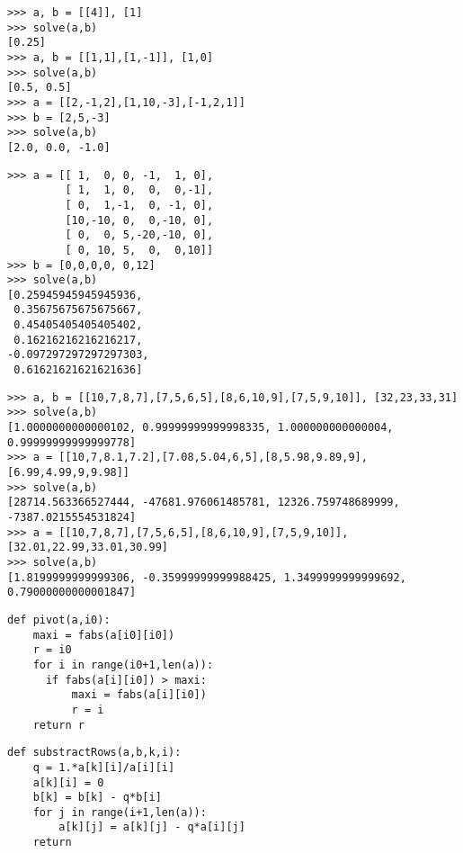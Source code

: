 \begin{description}
\begin{py}{6cm}
\begin{verbatim}
>>> a, b = [[4]], [1]
>>> solve(a,b)
[0.25]
>>> a, b = [[1,1],[1,-1]], [1,0]
>>> solve(a,b)
[0.5, 0.5]
>>> a = [[2,-1,2],[1,10,-3],[-1,2,1]]
>>> b = [2,5,-3]
>>> solve(a,b)
[2.0, 0.0, -1.0]
\end{verbatim}
\end{py}
\hfill
\begin{py}{6cm}
\begin{verbatim}
>>> a = [[ 1,  0, 0, -1,  1, 0],
         [ 1,  1, 0,  0,  0,-1],
         [ 0,  1,-1,  0, -1, 0],
         [10,-10, 0,  0,-10, 0],
         [ 0,  0, 5,-20,-10, 0],
         [ 0, 10, 5,  0,  0,10]]
>>> b = [0,0,0,0, 0,12]
>>> solve(a,b)
[0.25945945945945936, 
 0.35675675675675667, 
 0.45405405405405402, 
 0.16216216216216217, 
-0.097297297297297303, 
 0.61621621621621636]
\end{verbatim}
\end{py}
\vspace*{2mm}

\begin{py}{14cm}
\begin{verbatim}
>>> a, b = [[10,7,8,7],[7,5,6,5],[8,6,10,9],[7,5,9,10]], [32,23,33,31]
>>> solve(a,b)
[1.0000000000000102, 0.99999999999998335, 1.000000000000004, 0.99999999999999778]
>>> a = [[10,7,8.1,7.2],[7.08,5.04,6,5],[8,5.98,9.89,9],[6.99,4.99,9,9.98]]
>>> solve(a,b)
[28714.563366527444, -47681.976061485781, 12326.759748689999, -7387.0215554531824]
>>> a = [[10,7,8,7],[7,5,6,5],[8,6,10,9],[7,5,9,10]], [32.01,22.99,33.01,30.99]
>>> solve(a,b)
[1.8199999999999306, -0.35999999999988425, 1.3499999999999692, 0.79000000000001847]
\end{verbatim}
\end{py}

\newpage

\begin{py}{6cm}
\begin{verbatim}
def pivot(a,i0):
    maxi = fabs(a[i0][i0])
    r = i0
    for i in range(i0+1,len(a)):
      if fabs(a[i][i0]) > maxi:
          maxi = fabs(a[i][i0])
          r = i
    return r
\end{verbatim}
\end{py}
\hfill
\begin{py}{6cm}
\begin{verbatim}
def substractRows(a,b,k,i):
    q = 1.*a[k][i]/a[i][i]
    a[k][i] = 0
    b[k] = b[k] - q*b[i]
    for j in range(i+1,len(a)):
        a[k][j] = a[k][j] - q*a[i][j]
    return 
\end{verbatim}
\end{py}
\vspace*{2mm}


\end{description}
